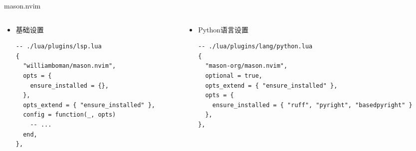 \documentclass[aspectratio=169]{ctexbeamer}
\begin{document}
\begin{frame}[fragile]{mason.nvim}
  \begin{columns}
    \begin{column}[t]{0.5\linewidth}
      \begin{itemize}
        \item 基础设置
          \begin{lstlisting}[basicstyle=\tiny\ttfamily]
-- ./lua/plugins/lsp.lua
{
  "williamboman/mason.nvim",
  opts = {
    ensure_installed = {},
  },
  opts_extend = { "ensure_installed" },
  config = function(_, opts)
    -- ...
  end,
},
          \end{lstlisting}
      \end{itemize}
    \end{column}

    \begin{column}[t]{0.5\linewidth}
      \begin{itemize}
        \item Python语言设置
          \begin{lstlisting}[basicstyle=\tiny\ttfamily]
-- ./lua/plugins/lang/python.lua
{
  "mason-org/mason.nvim",
  optional = true,
  opts_extend = { "ensure_installed" },
  opts = {
    ensure_installed = { "ruff", "pyright", "basedpyright" }
  },
},
          \end{lstlisting}
      \end{itemize}
    \end{column}
  \end{columns}
\end{frame}
\end{document}
